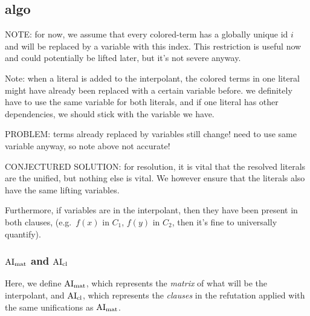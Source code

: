 \documentclass[,%
	paper=a4,%
	DIV10, %
	twoside=false,%
	liststotoc,
	bibtotoc,
	draft=false,%
	numbers=noendperiod
]{scrartcl}
\begin{document}
\subsection{algo}

NOTE: for now, we assume that every colored-term has a globally unique id $i$ and will be replaced by a variable with this index. 
This restriction is useful now and could potentially be lifted later, but it's not severe anyway.

Note: when a literal is added to the interpolant, the colored terms in one literal might have already been replaced with a certain variable before. we definitely have to use the same variable for both literals, and if one literal has other dependencies, we should stick with the variable we have.

PROBLEM: terms already replaced by variables still change! need to use same variable anyway, so note above not accurate!

CONJECTURED SOLUTION: for resolution, it is vital that the resolved literals are the unified, but nothing else is vital. We however ensure that the literals also have the same lifting variables.   

Furthermore, if variables are in the interpolant, then they have been present in both clauses, (e.g.~$f(x)$ in $C_1$, $f(y)$ in $C_2$, then it's fine to universally quantify).


\subsubsection{$\operatorname{AI}_\mathrm{mat}$ and $\operatorname{AI}_\mathrm{cl}$}

Here, we define $\operatorname{AI}_\mathrm{mat}$, which represents the \emph{matrix} of what will be the interpolant, and $\operatorname{AI}_\mathrm{cl}$, which represents the \emph{clauses} in the refutation applied with the same unifications as $\operatorname{AI}_\mathrm{mat}$.
\end{document}
